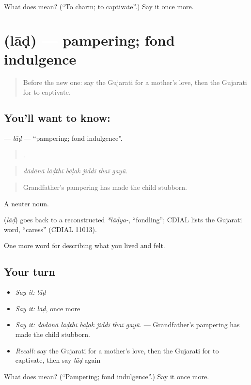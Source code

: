 \begin{tcolorbox}[breakable,colback=teal!4,colframe=teal!35!black,title={Before you move on}]
What does  mean? (\textquotedblleft{}To charm; to captivate\textquotedblright{}.) Say it once more.
\end{tcolorbox}
\section[\texorpdfstring{\gu{લાડ} (lāḍ)}{લાડ (lāḍ)}]{ (lāḍ) — pampering; fond indulgence}

\label{lesson:GU-C450-lad}



\begin{quote}
Before the new one: say the Gujarati for a mother's love, then the Gujarati for to captivate.
\end{quote}

\subsection*{You'll want to know: }
\textbf{} — \emph{lāḍ} — \textquotedblleft{}pampering; fond indulgence\textquotedblright{}.

\begin{quote}
     .
\end{quote}

\begin{quote}
\emph{dādānā lāḍthī bāḷak jiddī thaī gayũ.}
\end{quote}

\begin{quote}
Grandfather's pampering has made the child stubborn.
\end{quote}

A neuter noun.

\begin{cousinweb}
\textbf{} (\emph{lāḍ}) goes back to a reconstructed \emph{*lāḍya-}, \textquotedblleft{}fondling\textquotedblright{}; CDIAL lists the Gujarati word, \textquotedblleft{}caress\textquotedblright{} (CDIAL 11013).
\end{cousinweb}

\begin{grammarlens}[title={What you've built}]
One more word for describing what you lived and felt.
\end{grammarlens}

\subsection*{Your turn}
\begin{itemize}
\raggedright
  \item \emph{Say it:} \emph{lāḍ}
  \item \emph{Say it:} \emph{lāḍ}, once more
  \item \emph{Say it:} \emph{dādānā lāḍthī bāḷak jiddī thaī gayũ.} — Grandfather's pampering has made the child stubborn.
  \item \emph{Recall:} say the Gujarati for a mother's love, then the Gujarati for to captivate, then say \emph{lāḍ} again
\end{itemize}

\begin{tcolorbox}[breakable,colback=teal!4,colframe=teal!35!black,title={Before you move on}]
What does  mean? (\textquotedblleft{}Pampering; fond indulgence\textquotedblright{}.) Say it once more.
\end{tcolorbox}
